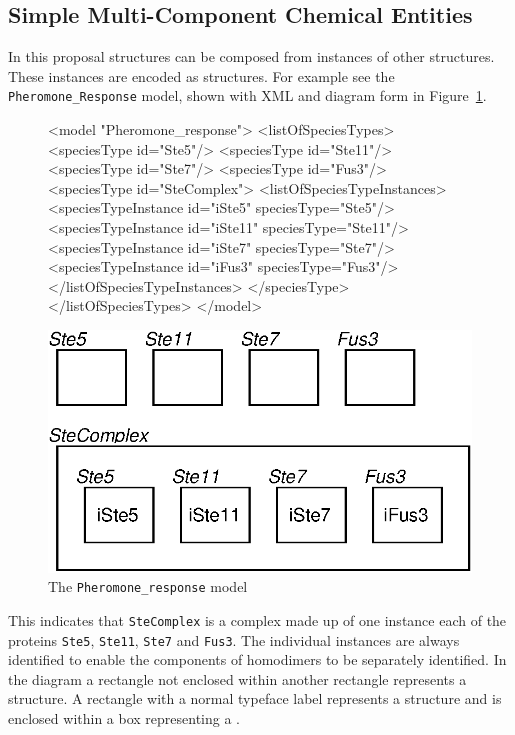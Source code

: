 \documentclass{cekarticle}
\begin{document}
\subsection{Simple Multi-Component Chemical Entities}
\label{sec:multicomponentspecies}

In this proposal  structures can be composed
from instances of other  structures. These
instances are encoded as  structures.
For example see the \texttt{Pheromone\_Response} model, shown with
XML and diagram form in Figure~\ref{fig:pheromone_response}.

\begin{figure}[h]
\begin{example}
<model "Pheromone_response">
    <listOfSpeciesTypes>
        <speciesType id="Ste5"/>
        <speciesType id="Ste11"/>
        <speciesType id="Ste7"/>
        <speciesType id="Fus3"/>
        <speciesType id="SteComplex">
            <listOfSpeciesTypeInstances>
                <speciesTypeInstance id="iSte5" speciesType="Ste5"/>
                <speciesTypeInstance id="iSte11" speciesType="Ste11"/>
                <speciesTypeInstance id="iSte7" speciesType="Ste7"/>
                <speciesTypeInstance id="iFus3" speciesType="Fus3"/>
            </listOfSpeciesTypeInstances>
        </speciesType>
    </listOfSpeciesTypes>
</model>
\end{example}
  \vspace*{8pt}
  \centering
  \includegraphics[scale = 0.7]{pheromone_response.eps}
  \caption{The \texttt{Pheromone\_response} model}
  \label{fig:pheromone_response}
\end{figure}

This indicates that \texttt{SteComplex} is a complex made up of
one instance each of the proteins \texttt{Ste5}, \texttt{Ste11},
\texttt{Ste7} and \texttt{Fus3}.  The individual instances are
always identified to enable the components of homodimers to be
separately identified.  In the diagram a rectangle not enclosed
within another rectangle represents a 
structure. A rectangle with a normal typeface label represents a
 structure and is enclosed within a box
representing a .
\end{document}
